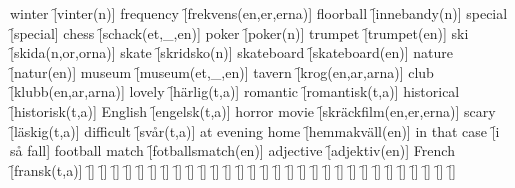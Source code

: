 \begin{questions}
\begin{multicols}{2}
        \question winter \f[vinter(n)]
        \question frequency \f[frekvens(en,er,erna)]
        \question floorball \f[innebandy(n)]
        \question special \f[special]
        \question chess \f[schack(et,\_,en)]
        \question poker \f[poker(n)]
        \question trumpet \f[trumpet(en)]
        \question ski \f[skida(n,or,orna)]
        \question skate \f[skridsko(n)]
        \question skateboard \f[skateboard(en)]
        \question nature \f[natur(en)]
        \question museum \f[museum(et,\_,en)]
        \question tavern \f[krog(en,ar,arna)]
        \question club \f[klubb(en,ar,arna)]
        \question lovely \f[härlig(t,a)]
        \question romantic \f[romantisk(t,a)]
        \question historical \f[historisk(t,a)]
        \question English \f[engelsk(t,a)]
        \question horror movie \f[skräckfilm(en,er,erna)]
        \question scary \f[läskig(t,a)]
        \question difficult \f[svår(t,a)]
        \question at evening home \f[hemmakväll(en)]
        \question in that case \f[i så fall]
        \question football match \f[fotballsmatch(en)]
        \question adjective \f[adjektiv(en)]
        \question French \f[fransk(t,a)]
        \question  \f[]
        \question  \f[]
        \question  \f[]
        \question  \f[]
        \question  \f[]
        \question  \f[]
        \question  \f[]
        \question  \f[]
        \question  \f[]
        \question  \f[]
        \question  \f[]
        \question  \f[]
        \question  \f[]
        \question  \f[]
        \question  \f[]
        \question  \f[]
        \question  \f[]
        \question  \f[]
        \question  \f[]
        \question  \f[]
        \question  \f[]
        \question  \f[]
        \question  \f[]
        \question  \f[]
        \question  \f[]
        \question  \f[]
        \question  \f[]
        \question  \f[]
        \question  \f[]
        \question  \f[]
    \end{multicols}
\end{questions}
